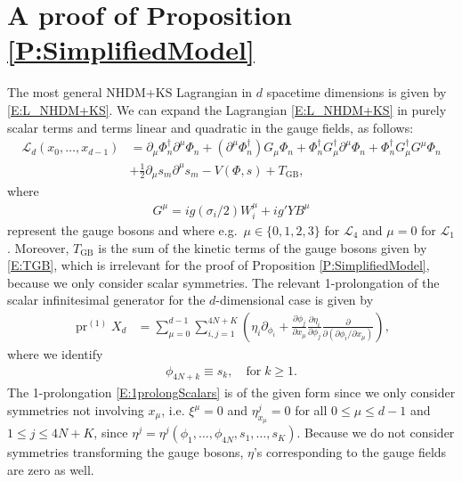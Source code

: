 \documentclass[a4paper,hidelinks, 12pt]{article}
\numberwithin{equation}{section}
\theoremstyle{plain}
\newcommand{\nn}{\nonumber}
\newcommand{\mc}{\mathcal}
\newcommand{\on}{\operatorname}
\begin{document}
\section{A proof of Proposition \ref{P:SimplifiedModel}}
\label{sec:ProofOfProposition}
The most general NHDM+KS Lagrangian in $d$ spacetime dimensions is given by
\eqref{E:L_NHDM+KS}.
 We can expand the Lagrangian \eqref{E:L_NHDM+KS} in purely scalar terms and terms linear and quadratic in the gauge fields, as follows:
\begin{align}\label{E:L_NHDM+KSgb}
	\mc{L}_d(x_0,\ldots,x_{d-1})&=\partial_\mu\Phi_n^\dag \partial^\mu \Phi_n+
	(\partial^\mu \Phi_n^\dag) G_\mu \Phi_n+\Phi_n^\dag G_\mu^\dag \partial^\mu \Phi_n+\Phi_n^\dag G_\mu^\dag G^\mu \Phi_n \nn \\
	&+\frac{1}{2}\partial_\mu s_m\partial^\mu s_m-V(\Phi,s)+T_\text{GB},
\end{align}
where 
\begin{align}
G^\mu=ig(\sigma_i/2)W^\mu_i + ig'YB^\mu	
\end{align}
represent the gauge bosons and where e.g.~$\mu \in \{0,1,2,3\}$ for $\mc{L}_4$ and $\mu=0$ for $\mc{L}_1$. Moreover, $T_\text{GB}$ is the sum of the kinetic terms of the gauge bosons
given by \eqref{E:TGB}, which is irrelevant for the proof of Proposition \ref{P:SimplifiedModel}, because we only consider scalar symmetries.
The relevant 1-prolongation of the scalar infinitesimal generator for the $d$-dimensional case is given by
\begin{align}\label{E:1prolongScalars}
	\on{pr}^{(1)} X_d&=\sum_{\mu=0}^{d-1} \sum_{i,j=1}^{4N+K}(\eta_i\partial_{\phi_i}+%
	\frac{\partial \phi_j}{\partial{x_\mu}}\frac{\partial \eta_i}{\partial\phi_j}\frac{\partial}{\partial (\partial \phi_i/\partial x_\mu)}),
\end{align}
where we identify
\begin{align}\label{E:phisvsss}
	\phi_{4N+k}\equiv s_k,\quad \text{for} \; k \geq 1. 
\end{align}
The 1-prolongation \eqref{E:1prolongScalars} is of the given form since we only consider symmetries not involving $x_\mu$, i.e. 
$\xi^{\mu}=0$ and $\eta^j_{x_\mu}=0$ for all $0\leq \mu \leq d-1$ and $1\leq j\leq 4N+K$, since $\eta^j=\eta^j(\phi_1,\ldots,\phi_{4N},s_1,\ldots,s_K)$. Because we do not consider symmetries transforming the gauge bosons, $\eta$'s corresponding to the gauge fields are zero as well. 
\end{document}
